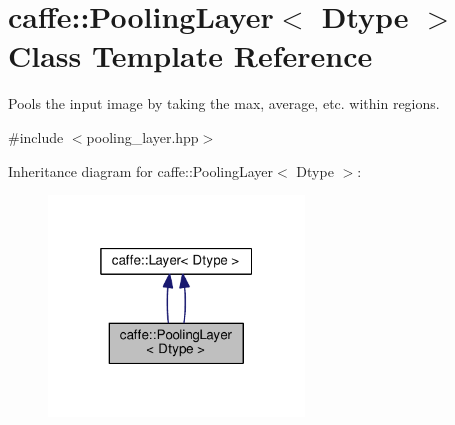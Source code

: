 \hypertarget{classcaffe_1_1_pooling_layer}{}\section{caffe\+:\+:Pooling\+Layer$<$ Dtype $>$ Class Template Reference}
\label{classcaffe_1_1_pooling_layer}


Pools the input image by taking the max, average, etc. within regions.  




{\ttfamily \#include $<$pooling\+\_\+layer.\+hpp$>$}



Inheritance diagram for caffe\+:\+:Pooling\+Layer$<$ Dtype $>$\+:
\nopagebreak
\begin{figure}[H]
\begin{center}
\leavevmode
\includegraphics[width=193pt]{classcaffe_1_1_pooling_layer__inherit__graph}
\end{center}
\end{figure}
